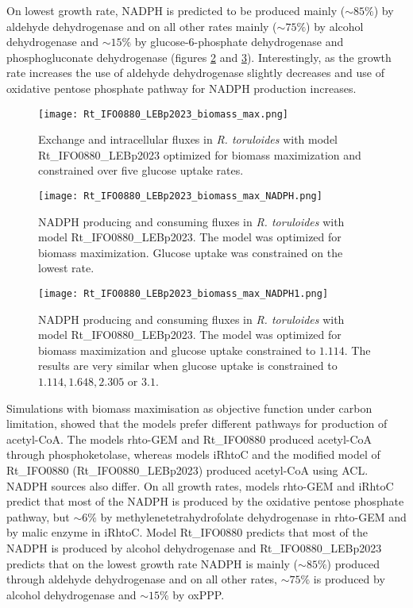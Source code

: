 On lowest growth rate, NADPH is predicted to be produced mainly ($\sim 85\%$) by aldehyde dehydrogenase and on all other 
rates mainly ($\sim 75\%$) by alcohol 
dehydrogenase and $\sim 15\%$ by glucose-6-phosphate dehydrogenase and phosphogluconate dehydrogenase (figures \ref{fig:Rt_IFO0880_LEBp2023_biomass_max_NADPH0} 
and \ref{fig:Rt_IFO0880_LEBp2023_biomass_max_NADPH1}). 
Interestingly, as the growth rate increases the use of aldehyde dehydrogenase slightly decreases and use of oxidative pentose phosphate pathway for NADPH production increases.


\begin{figure}[H]
    \centering
    \texttt{[image: Rt\_IFO0880\_LEBp2023\_biomass\_max.png]}
    \caption{Exchange and intracellular fluxes in \textit{R. toruloides} with model Rt\_IFO0880\_LEBp2023 optimized for biomass maximization 
    and constrained over five glucose uptake rates.}
    \label{fig:Rt_IFO0880_LEBp2023_biomass_max}
\end{figure}
\begin{figure}[H]
    \centering
    \texttt{[image: Rt\_IFO0880\_LEBp2023\_biomass\_max\_NADPH.png]}
    \caption{NADPH producing and consuming fluxes in \textit{R. toruloides} with model Rt\_IFO0880\_LEBp2023. The model was optimized for biomass maximization. 
    Glucose uptake was constrained on the lowest rate.}
    \label{fig:Rt_IFO0880_LEBp2023_biomass_max_NADPH0}
\end{figure}
\begin{figure}[H]
    \centering
    \texttt{[image: Rt\_IFO0880\_LEBp2023\_biomass\_max\_NADPH1.png]}
    \caption{NADPH producing and consuming fluxes in \textit{R. toruloides} with model Rt\_IFO0880\_LEBp2023. The model was optimized for biomass maximization 
    and glucose uptake constrained to $1.114$. 
    The results are very similar when glucose uptake is constrained to $1.114, 1.648, 2.305$ or $3.1$.}
    \label{fig:Rt_IFO0880_LEBp2023_biomass_max_NADPH1}
\end{figure}

Simulations with biomass maximisation as objective function under carbon limitation, showed that the models prefer different pathways for 
production of acetyl-CoA. The models rhto-GEM and Rt\_IFO0880 produced acetyl-CoA through phosphoketolase, whereas models iRhtoC and the modified model 
of Rt\_IFO0880 (Rt\_IFO0880\_LEBp2023) produced acetyl-CoA using ACL. NADPH sources also differ. On all growth rates,
 models rhto-GEM and iRhtoC predict that
most of the NADPH is produced by the oxidative pentose phosphate pathway, but $\sim 6\%$ by methylenetetrahydrofolate dehydrogenase 
in rhto-GEM and by malic enzyme in iRhtoC. Model Rt\_IFO0880 predicts that most of the NADPH is produced by alcohol dehydrogenase
and Rt\_IFO0880\_LEBp2023 predicts that on the lowest growth rate NADPH is mainly ($\sim 85\%$) produced through aldehyde dehydrogenase 
and on all other rates, $\sim 75\%$ is produced by alcohol dehydrogenase and $\sim 15\%$ by oxPPP.


